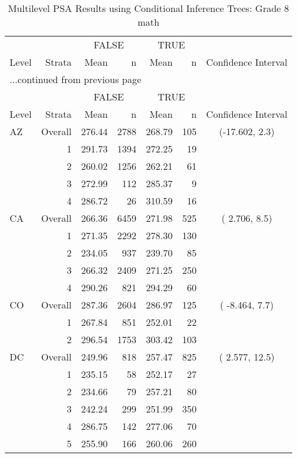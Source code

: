 \begin{longtable}{lrrr@{\extracolsep{.25cm}}rrc}
\caption{Multilevel PSA Results using Conditional Inference Trees: Grade 8 math} \\ 
   \hline & & \multicolumn{2}{c}{FALSE} & \multicolumn{2}{c}{TRUE} & \\ \cline{3-4} \cline{5-6} Level & Strata & Mean & n & Mean & n & Confidence Interval \\ \hline\endfirsthead \multicolumn{7}{l}{{...continued from previous page}}\\ \hline  & & \multicolumn{2}{c}{FALSE} & \multicolumn{2}{c}{TRUE} & \\ \cline{3-4} \cline{5-6} Level & Strata & Mean & n & Mean & n & Confidence Interval \\ \hline \endhead \endfoot \endlastfoot  \hline
AZ & Overall & 276.44 & 2788 & 268.79 & 105 & (-17.602,   2.3) \\ 
   & 1 & 291.73 & 1394 & 272.25 &  19 &  \\ 
   & 2 & 260.02 & 1256 & 262.21 &  61 &  \\ 
   & 3 & 272.99 & 112 & 285.37 &   9 &  \\ 
   & 4 & 286.72 &  26 & 310.59 &  16 &  \\ 
   \hline
CA & Overall & 266.36 & 6459 & 271.98 & 525 & (  2.706,   8.5) \\ 
   & 1 & 271.35 & 2292 & 278.30 & 130 &  \\ 
   & 2 & 234.05 & 937 & 239.70 &  85 &  \\ 
   & 3 & 266.32 & 2409 & 271.25 & 250 &  \\ 
   & 4 & 290.26 & 821 & 294.29 &  60 &  \\ 
   \hline
CO & Overall & 287.36 & 2604 & 286.97 & 125 & ( -8.464,   7.7) \\ 
   & 1 & 267.84 & 851 & 252.01 &  22 &  \\ 
   & 2 & 296.54 & 1753 & 303.42 & 103 &  \\ 
   \hline
DC & Overall & 249.96 & 818 & 257.47 & 825 & (  2.577,  12.5) \\ 
   & 1 & 235.15 &  58 & 252.17 &  27 &  \\ 
   & 2 & 234.66 &  79 & 257.21 &  80 &  \\ 
   & 3 & 242.24 & 299 & 251.99 & 350 &  \\ 
   & 4 & 286.75 & 142 & 277.06 &  70 &  \\ 
   & 5 & 255.90 & 166 & 260.06 & 260 &  \\ 

\end{longtable}

